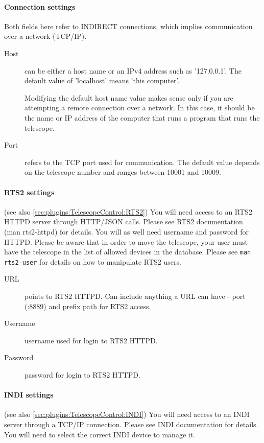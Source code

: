 \paragraph{Connection settings}
Both fields here refer to INDIRECT connections, which implies communication over a network (TCP/IP). 
\begin{description}
\item[Host] can be either a host name or an IPv4 address such as
  '127.0.0.1'.  The default value of 'localhost' means 'this
  computer'. 

  Modifying the default host name value makes sense only if you are
  attempting a remote connection over a network. In this case, it
  should be the name or IP address of the computer that runs a program
  that runs the telescope.
\item[Port] refers to the TCP port used for communication. The default
  value depends on the telescope number and ranges between 10001 and
  10009.
\end{description}

\paragraph{RTS2 settings} (see also \ref{sec:plugins:TelescopeControl:RTS2})
You will need access to an RTS2 HTTPD server through HTTP/JSON calls.
Please see RTS2 documentation (man rts2-httpd) for details. You will as well need username
and password for HTTPD. Please be aware that in order to move the telescope,
your user must have the telescope in the list of allowed devices in the database. Please see \texttt{man
rts2-user} for details on how to manipulate RTS2 users.

\begin{description}
\item[URL] points to RTS2 HTTPD. Can include anything a URL can have - port
  (:8889) and prefix path for RTS2 access.
\item[Username] username used for login to RTS2 HTTPD.
\item[Password] password for login to RTS2 HTTPD.
\end{description}

\paragraph{INDI settings} (see also \ref{sec:plugins:TelescopeControl:INDI})
You will need access to an INDI server through a TCP/IP connection.
Please see INDI documentation for details. You will need to select the correct INDI device to manage it.

